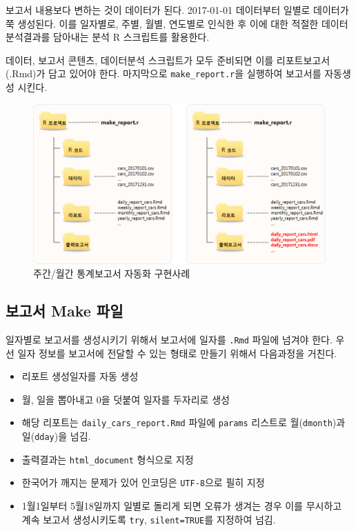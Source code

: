 \documentclass[
  letterpaper,
  chapter,a4paper,showtrims,openright,hidelinks]{oblivoir}
\providecommand{\tightlist}{%
  \setlength{\itemsep}{0pt}\setlength{\parskip}{0pt}}\usepackage{longtable,booktabs,array}
\begin{document}
보고서 내용보다 변하는 것이 데이터가 된다. 2017-01-01 데이터부터 일별로
데이터가 쭉 생성된다. 이를 일자별로, 주별, 월별, 연도별로 인식한 후 이에
대한 적절한 데이터 분석결과를 담아내는 분석 R 스크립트를 활용한다.

데이터, 보고서 콘텐츠, 데이터분석 스크립트가 모두 준비되면 이를
리포트보고서(.Rmd)가 담고 있어야 한다. 마지막으로
\texttt{make\_report.r}을 실행하여 보고서를 자동생성 시킨다.

\begin{figure}

{\centering \includegraphics{images/report-automation-before-after.png}

}

\caption{주간/월간 통계보고서 자동화 구현사례}

\end{figure}

\hypertarget{uxbcf4uxace0uxc11c-make-uxd30cuxc77c}{%
\subsection{보고서 Make
파일}\label{uxbcf4uxace0uxc11c-make-uxd30cuxc77c}}

일자별로 보고서를 생성시키기 위해서 보고서에 일자를 \texttt{.Rmd} 파일에
넘겨야 한다. 우선 일자 정보를 보고서에 전달할 수 있는 형태로 만들기
위해서 다음과정을 거친다.

\begin{itemize}
\tightlist
\item
  리포트 생성일자를 자동 생성
\item
  월, 일을 뽑아내고 0을 덧붙여 일자를 두자리로 생성
\item
  해당 리포트는 \texttt{daily\_cars\_report.Rmd} 파일에 \texttt{params}
  리스트로 월(\texttt{dmonth})과 일(\texttt{dday})을 넘김.
\item
  출력결과는 \texttt{html\_document} 형식으로 지정
\item
  한국어가 깨지는 문제가 있어 인코딩은 \texttt{UTF-8}으로 필히 지정
\item
  1월1일부터 5월18일까지 일별로 돌리게 되면 오류가 생겨는 경우 이를
  무시하고 계속 보고서 생성시키도록 \texttt{try}, \texttt{silent=TRUE}를
  지정하여 넘김.
\end{itemize}
\end{document}
